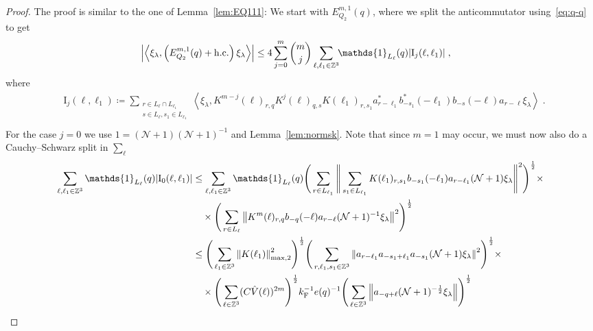 \documentclass[12pt,a4paper]{article}
\numberwithin{equation}{section}
\newcommand{\1}{\mathbb{I}}
\newcommand{\F}{\mathrm{F}}
\newcommand{\I}{\mathrm{I}}
\newcommand{\Zstar}{\mathbb{Z}^3} %
\newcommand{\Z}{\mathbb{Z}}
\newcommand{\NN}{\mathcal{N}}
\newcommand{\half}{\frac{1}{2}}
\newcommand{\eva}[1]{\left\langle #1 \right\rangle}
\theoremstyle{plain}
\theoremstyle{definition}
\theoremstyle{remark}
\theoremstyle{plain}
\theoremstyle{definition}
\theoremstyle{remark}
\begin{document}
\begin{proof}
The proof is similar to the one of Lemma~\ref{lem:EQ111}: We start with $ E^{m,1}_{Q_2}(q) $, where we split the anticommutator using~\eqref{eq:q-q} to get
\begin{equation} \label{eq:EQ2111}
\begin{aligned}
	& \abs{\eva{\xi_\lambda,\left(E^{m,1}_{Q_2}(q) + \mathrm{h.c.}\right) \xi_\lambda }}
	\le 4 \sum_{j=0}^m {{m}\choose j} \sum_{\ell,\ell_1 \in \Zstar}\!\! \mathds{1}_{L_\ell}(q) |\I_j(\ell, \ell_1)| \;,
	\end{aligned}
\end{equation}
where
\begin{equation}
\begin{aligned}
	& \I_j(\ell, \ell_1)
	\coloneq \sum_{\substack{r\in L_{\ell} \cap L_{\ell_1}\\ s \in L_{\ell},s_1\in L_{\ell_1}}}
		\eva{\xi_\lambda, K^{m-j}(\ell)_{r,q} K^{j}(\ell)_{q,s} K(\ell_1)_{r,s_1} a^*_{r-\ell_1} b^*_{-s_1}(-\ell_1) b_{-s}(-\ell) a_{r-\ell} \xi_\lambda} \;. \\
\end{aligned}
\end{equation}
For the case $ j = 0 $ we use $1 = (\NN+1) (\NN+1)^{-1}$ and Lemma~\ref{lem:normsk}. Note that since $ m = 1 $ may occur, we must now also do a Cauchy--Schwarz split in $ \sum_\ell $
\begin{align}
	\sum_{\ell,\ell_1 \in \Zstar} \mathds{1}_{L_\ell}(q) |\I_0(\ell, \ell_1)|
 	&\leq \sum\limits_{\ell,\ell_1 \in \Zstar} \mathds{1}_{L_\ell}(q) \Bigg( \sum\limits_{r \in L_{\ell_1}} 
 		\Bigg\Vert \sum\limits_{s_1 \in L_{\ell_1}} K(\ell_1)_{r,s_1} b_{-s_1}(-\ell_1) a_{r-\ell_1} (\NN+1) \xi_\lambda \Bigg\Vert^2\Bigg)^\half \times\nonumber\\
 	&\quad \times \Bigg( \sum\limits_{r \in L_\ell} \norm{K^{m}(\ell)_{r,q} b_{-q}(-\ell) a_{r-\ell} (\NN+1)^{-1}\xi_\lambda }^2\Bigg)^\half \nonumber\\
 	&\leq \Bigg( \sum\limits_{\ell_1 \in \Zstar} \norm{K(\ell_1)}_{\mathrm{max,2}}^2 \Bigg)^{\half} \Bigg(
 		\sum\limits_{r, \ell_1, s_1 \in \Z^3} \norm{a_{r-\ell_1} a_{-s_1+\ell_1} a_{-s_1} (\NN+1) \xi_\lambda}^2\Bigg)^\half \times\nonumber\\
 	&\quad \times \Bigg( \sum\limits_{\ell \in \Zstar}(C \hat{V}(\ell))^{2m} \Bigg)^{\half}
 		k_{\F}^{-1} e(q)^{-1}
 		\Bigg( \sum\limits_{\ell \in \Z^3} \norm{a_{-q + \ell} (\NN+1)^{-\half} \xi_\lambda } \Bigg)^{\half} \nonumber\\

\end{align}
\end{proof}
\end{document}
